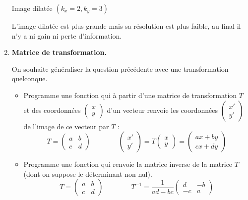 \documentclass[11pt,class=report,crop=false]{standalone}
\begin{document}
\begin{activite}
\begin{enumerate}
\begin{center}
\begin{minipage}{0.45\textwidth}
		Image dilatée $(k_x=2,k_y=3)$
	\end{minipage}	
	\end{center}
  	L'image dilatée est plus grande mais sa résolution est plus faible, au final il n'y a ni gain ni perte d'information.	
		
	\item \textbf{Matrice de transformation.}
	
	On souhaite généraliser la question précédente avec une transformation quelconque.
	\begin{itemize}
		\item Programme une fonction  qui à partir d'une matrice de transformation $T$ et des coordonnées $\left(\begin{smallmatrix}x\\y\end{smallmatrix}\right)$ d'un vecteur renvoie les coordonnées $\left(\begin{smallmatrix}x'\\y'\end{smallmatrix}\right)$ de l'image de ce vecteur par $T$ :
		$$T = \begin{pmatrix}a&b\\c&d\end{pmatrix}\qquad\qquad
		\begin{pmatrix}x' \\ y' \end{pmatrix} = T \begin{pmatrix}x \\ y \end{pmatrix}
		= \begin{pmatrix}ax+by \\ cx+dy \end{pmatrix}$$
		
		\item Programme une fonction  qui renvoie la matrice inverse de la matrice $T$ (dont on suppose le déterminant non nul).
		$$T = \begin{pmatrix}a&b\\c&d\end{pmatrix}
		\qquad \qquad
		T^{-1} = \frac{1}{ad-bc}\begin{pmatrix}d&-b\\-c&a\end{pmatrix}$$
		

\end{itemize}
\end{enumerate}
\end{activite}
\end{document}
